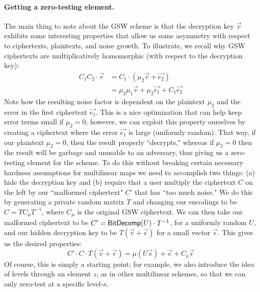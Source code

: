 \paragraph{Getting a zero-testing element.}
The main thing to note about the GSW scheme is that the decryption key $\vec{v}$ exhibits some interesting properties that allow us some asymmetry with respect to ciphertexts, plaintexts, and noise growth.  To illustrate, we recall why GSW ciphertexts are multiplicatively homomorphic (with respect to the decryption key):
\begin{align*}
C_1C_2\cdot \vec{v} &= C_1\cdot (\mu_2 \vec{v} + \vec{e_2})\\
&= \mu_2\mu_1 \vec{v} + \mu_2\vec{e_1}+ C_1\vec{e_2}
\end{align*}
Note how the resulting noise factor is dependent on the plaintext $\mu_2$ and the error in the first ciphertext $\vec{e_1}$.  This is a nice optimization that can help keep error terms small if $\mu_2 = 0$; however, we can exploit this property ourselves by creating a ciphertext where the error $\vec{e_1}$ is large (uniformly random).  That way, if our plaintext $\mu_2 = 0$, then the result properly ``decrypts," whereas if $\mu_2 = 0$ then the result will be garbage and unusable to an adversary, thus giving us a zero-testing element for the scheme.  To do this without breaking certain necessary hardness assumptions for multilinear maps we need to accomplish two things: (a) hide the decryption key and (b) require that a user multiply the ciphertext $C$ on the left by our ``malformed ciphertext" $C'$ that has ``too much noise."  We do this by generating a private random matrix $T$ and changing our encodings to be $C = TC_\mu T^{-1}$, where $C_\mu$ is the original GSW ciphertext.  We can then take our malformed ciphertext to be $C' = \mathsf{BitDecomp}(U)\cdot T^{-1}$, for a uniformly random $U$, and our hidden decryption key to be $T(\vec{v} + \vec{\epsilon})$ for a small vector $\vec{\epsilon}$.  This gives us the desired properties:
$$C'\cdot C \cdot T(\vec{v} + \vec{\epsilon}) = \mu (U\vec{s}) + \vec{e} + C_\mu\vec{\epsilon}$$
Of course, this is simply a starting point; for example, we also introduce the idea of levels through an element $z$, as in other multilinear schemes, so that we can only zero-test at a specific level-$\kappa$. 
